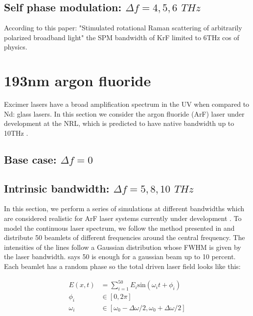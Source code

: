 \subsection{Self phase modulation: $\Delta f=4,5,6$ $\si{THz}$}

According to this paper: "Stimulated rotational Raman scattering of arbitrarily polarized broadband light" \citep{Lehmberg2020} the SPM bandwidth of KrF limited to 6THz cos of physics.

\section{193nm argon fluoride}\label{sec:193}
Excimer lasers have a broad amplification spectrum in the UV when compared to Nd: glass lasers. In this section we consider the argon fluoride (ArF) laser under development at the NRL, which is predicted to have native bandwidth up to 10THz \citep{Obenschain2020}.

\subsection{Base case: $\Delta f=0$}

\subsection{Intrinsic bandwidth: $\Delta f =5,8,10$ $\si{THz}$}
In this section, we perform a series of simulations at different bandwidths which are considered realistic for ArF laser systems currently under development \citep{Obenschain2020}. To model the continuous laser spectrum, we follow the method presented in \citet{Bates2020} and distribute 50 beamlets of different frequencies around the central frequency. The intensities of the lines follow a Gaussian distribution whose FWHM is given by the laser bandwidth. \citet{Follett2019} says 50 is enough for a gaussian beam up to 10 percent. Each beamlet has a random phase so the total driven laser field looks like this:



\begin{equation}
\begin{aligned}
	E(x,t) &= \sum_{i=1}^{50} E_i \mathrm{sin}(\omega_i t + \phi_i) \\
	\phi_i & \in  [0,2\pi] \\
	\omega_i & \in [\omega_0 - \Delta\omega / 2, \omega_0 + \Delta\omega / 2]
\end{aligned}
\end{equation}

